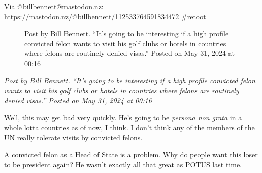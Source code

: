 Via \href{https://mastodon.nz/@billbennett/}{@billbennett@mastodon.nz}:
\url{https://mastodon.nz/@billbennett/112533764591834472} \#retoot

\begin{figure}
\centering
{}
\caption{Post by Bill Bennett. ``It's going to be interesting if a high
profile convicted felon wants to visit his golf clubs or hotels in
countries where felons are routinely denied visas.'' Posted on May 31,
2024 at 00:16}
\end{figure}

\emph{Post by Bill Bennett. ``It's going to be interesting if a high
profile convicted felon wants to visit his golf clubs or hotels in
countries where felons are routinely denied visas.'' Posted on May 31,
2024 at 00:16}

Well, this may get bad very quickly. He's going to be \emph{persona non
grata} in a whole lotta countries as of now, I think. I don't think any
of the members of the UN really tolerate visits by convicted felons.

A convicted felon as a Head of State is a problem. Why do people want
this loser to be president again? He wasn't exactly all that great as
POTUS last time.
